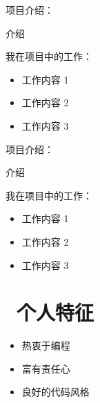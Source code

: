 \documentclass{resume}
\begin{document}

\vspace{1mm}\par
\noindent
项目介绍：

\vspace{1mm}\par
\setlength{\parindent}{2ex}
介绍

\vspace{1mm}\par
\noindent
我在项目中的工作：

\begin{itemize}[parsep=1ex]
  \item 工作内容 1
  \item 工作内容 2
  \item 工作内容 3
\end{itemize}


\vspace{1mm}\par
\noindent
项目介绍：

\vspace{1mm}\par
\setlength{\parindent}{2ex}

介绍
\vspace{1mm}\par
\noindent

我在项目中的工作：
\begin{itemize}[parsep=1ex]
  \item 工作内容 1
  \item 工作内容 2
  \item 工作内容 3
\end{itemize}

\section{\faUser\ 个人特征} \vspace{1mm}

\begin{itemize}[parsep=1ex]
  \item 热衷于编程
  \item 富有责任心
  \item 良好的代码风格
\end{itemize}
\end{document}
